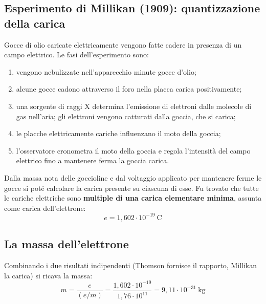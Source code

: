 \documentclass[11pt, a4paper, openright]{book}
\begin{document}
\subsection{Esperimento di Millikan (1909): quantizzazione della carica}
Gocce di olio caricate elettricamente vengono fatte cadere in presenza di un campo elettrico. Le fasi dell'esperimento sono:
\begin{enumerate}
    \item vengono nebulizzate nell'apparecchio minute gocce d'olio;
    \item alcune gocce cadono attraverso il foro nella placca carica positivamente;
    \item una sorgente di raggi X determina l'emissione di elettroni dalle molecole di gas nell'aria; gli elettroni vengono catturati dalla goccia, che si carica;
    \item le placche elettricamente cariche influenzano il moto della goccia;
    \item l'osservatore cronometra il moto della goccia e regola l'intensità del campo elettrico fino a mantenere ferma la goccia carica.
\end{enumerate}
Dalla massa nota delle goccioline e dal voltaggio applicato per mantenere ferme le gocce si poté calcolare la carica presente su ciascuna di esse. Fu trovato che tutte le cariche elettriche sono \textbf{multiple di una carica elementare minima}, assunta come carica dell'elettrone:
\[
e = 1{,}602 \cdot 10^{-19}\ \mathrm{C}
\]

\subsection{La massa dell'elettrone}
Combinando i due risultati indipendenti (Thomson fornisce il rapporto, Millikan la carica) si ricava la massa:
\[
m = \frac{e}{(e/m)} = \frac{1{,}602 \cdot 10^{-19}}{1{,}76 \cdot 10^{11}} = 9{,}11 \cdot 10^{-31}\ \mathrm{kg}
\]

\newpage
\end{document}
